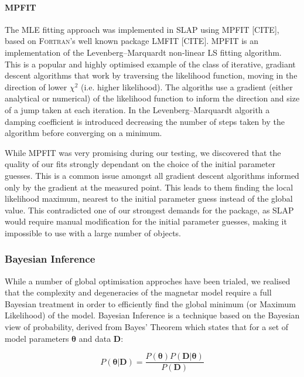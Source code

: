 \paragraph{MPFIT} \label{sec:MPFIT}
The MLE fitting approach was implemented in \textsc{SLAP} using \textsc{MPFIT} [CITE], based on \textsc{Fortran}'s well known package \textsc{LMFIT} [CITE]. \textsc{MPFIT} is an implementation of the Levenberg–Marquardt non-linear LS fitting algorithm. This is a popular and highly optimised example of the class of iterative, gradiant descent algorithms that work by traversing the likelihood function, moving in the direction of lower $\chi^2$ (i.e. higher likelihood). The algoriths use a gradient (either analytical or numerical) of the likelihood function to inform the direction and size of a jump taken at each iteration. In the Levenberg–Marquardt algorith a damping coefficient is introduced decreasing the number of steps taken by the algorithm before converging on a minimum.

While \textsc{MPFIT} was very promising during our testing, we discovered that the quality of our fits strongly dependant on the choice of the initial parameter guesses. This is a common issue amongst all gradient descent algorithms informed only by the gradient at the measured point. This leads to them finding the local likelihood maximum, nearest to the initial parameter guess instead of the global value. This contradicted one of our strongest demands for the package, as \textsc{SLAP} would require manual modification for the initial parameter guesses, making it impossible to use with a large number of objects.

\subsubsection{Bayesian Inference}
While a number of global optimisation approches have been trialed, we realised that the complexity and degeneracies of the magnetar model require a full Bayesian treatment in order to efficiently find the global minimum (or Maximum Likelihood) of the model. Bayesian Inference is a technique based on the Bayesian view of probability, derived from Bayes' Theorem which states that for a set of model parameters $\mathbf{\theta}$ and data $\mathbf{D}$:

\begin{equation}
  P(\mathbf{\theta}|\mathbf{D}) = \frac{P(\mathbf{\theta}) P(\mathbf{D}|\mathbf{\theta})}{P(\mathbf{D})}
\end{equation}

